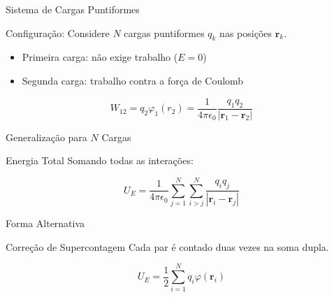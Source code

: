 \documentclass[aspectratio=169,11pt]{beamer}
\begin{document}
\begin{frame}{Sistema de Cargas Puntiformes}

\begin{mybox}{Configuração: }
Considere $N$ cargas puntiformes $q_k$ nas posições $\mathbf r_k$.
\end{mybox}

\begin{itemize}
\item Primeira carga: não exige trabalho ($E=0$)
\item Segunda carga: trabalho contra a força de Coulomb
\end{itemize}

\begin{eqbox}
\begin{equation}
W_{12}
=
q_2 \varphi_1(r_2)
=
\frac{1}{4\pi\epsilon_0}
\frac{q_1 q_2}{|\mathbf r_1 - \mathbf r_2|}
\tag{3.73}
\end{equation}
\end{eqbox}

\end{frame}

\begin{frame}{Generalização para $N$ Cargas}

\begin{mybox}{Energia Total}
Somando todas as interações:
\end{mybox}

\begin{eqbox}
\begin{equation}
U_E
=
\frac{1}{4\pi\epsilon_0}
\sum_{j=1}^{N}
\sum_{i>j}^{N}
\frac{q_i q_j}{|\mathbf r_i - \mathbf r_j|}
\tag{3.74}
\end{equation}
\end{eqbox}

\end{frame}

\begin{frame}{Forma Alternativa}

\begin{alertblock}{Correção de Supercontagem}
Cada par é contado duas vezes na soma dupla.
\end{alertblock}

\begin{eqbox}
\begin{equation}
U_E
=
\frac{1}{2}
\sum_{i=1}^{N}
q_i \varphi(\mathbf r_i)
\tag{3.75}
\end{equation}
\end{eqbox}

\end{frame}
\end{document}
